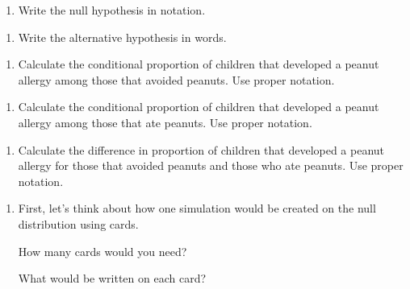\documentclass[
]{report}
\providecommand{\tightlist}{%
  \setlength{\itemsep}{0pt}\setlength{\parskip}{0pt}}
\begin{document}
\vspace{1in}

\begin{enumerate}
\def\labelenumi{\arabic{enumi}.}
\setcounter{enumi}{2}
\tightlist
\item
  Write the null hypothesis in notation.
\end{enumerate}

\vspace{0.5in}

\begin{enumerate}
\def\labelenumi{\arabic{enumi}.}
\setcounter{enumi}{3}
\tightlist
\item
  Write the alternative hypothesis in words.
\end{enumerate}

\vspace{0.8in}

\begin{enumerate}
\def\labelenumi{\arabic{enumi}.}
\setcounter{enumi}{4}
\tightlist
\item
  Calculate the conditional proportion of children that developed a peanut allergy among those that avoided peanuts. Use proper notation.
\end{enumerate}

\vspace{0.6in}

\begin{enumerate}
\def\labelenumi{\arabic{enumi}.}
\setcounter{enumi}{5}
\tightlist
\item
  Calculate the conditional proportion of children that developed a peanut allergy among those that ate peanuts. Use proper notation.
\end{enumerate}

\vspace{0.6in}

\begin{enumerate}
\def\labelenumi{\arabic{enumi}.}
\setcounter{enumi}{6}
\tightlist
\item
  Calculate the difference in proportion of children that developed a peanut allergy for those that avoided peanuts and those who ate peanuts. Use proper notation.
\end{enumerate}

\vspace{0.6in}

\begin{enumerate}
\def\labelenumi{\arabic{enumi}.}
\setcounter{enumi}{7}
\item
  First, let's think about how one simulation would be created on the null distribution using cards.

  How many cards would you need?
  \vspace{0.1in}

  What would be written on each card?
\end{enumerate}
\end{document}

